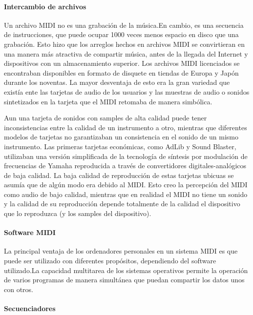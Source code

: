 \documentclass[a4paper,11pt,oneside]{book}
\begin{document}
\paragraph{Intercambio de archivos}


Un archivo MIDI no es una grabación de la música.En cambio, es una secuencia de instrucciones, que puede ocupar 1000 veces menos espacio en disco que una grabación. 
Esto hizo que los arreglos hechos en archivos MIDI se convirtieran en una manera más atractiva de compartir música, antes de la llegada del Internet y dispositivos con un almacenamiento superior. Los archivos MIDI licenciados se encontraban disponibles en formato de disquete en tiendas de Europa y Japón durante los noventas. La mayor desventaja de esto era la gran variedad que existía ente las tarjetas de audio de los usuarios y las muestras de audio o sonidos sintetizados en la tarjeta que el MIDI retomaba de manera simbólica. 

Aun una tarjeta de sonidos con samples de alta calidad puede tener inconsistencias entre la calidad de un instrumento a otro, mientras que diferentes modelos de tarjetas no garantizaban un consistencia en el sonido de un mismo instrumento. Las primeras tarjetas económicas, como AdLib y Sound Blaster, utilizaban una versión simplificada de la tecnología de síntesis por modulación de frecuencias de Yamaha reproducida a través de convertidores digitales-analógicos de baja calidad. La baja calidad de reproducción de estas tarjetas ubicuas se asumía que de algún modo era debido al MIDI.
Esto creo la percepción del MIDI como audio de bajo calidad, mientras que en realidad el MIDI no tiene un sonido  y la calidad de su reproducción depende totalmente de la calidad el dispositivo que lo reproduzca (y los samples del dispositivo).


\paragraph{Software MIDI}


La principal ventaja de los ordenadores personales en un sistema MIDI es que puede ser utilizado con diferentes propósitos, dependiendo del software utilizado.La capacidad multitarea de los sistemas operativos permite la operación de varios programas de manera simultánea que puedan compartir los datos unos con otros.


\paragraph{Secuenciadores}
\end{document}
